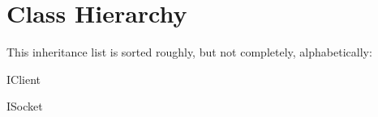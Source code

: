 \section{Class Hierarchy}
This inheritance list is sorted roughly, but not completely, alphabetically\+:\begin{DoxyCompactList}
\item I\+Client\begin{DoxyCompactList}
\item {}
\end{DoxyCompactList}
\item I\+Socket\begin{DoxyCompactList}
\item {}
\end{DoxyCompactList}
\end{DoxyCompactList}
